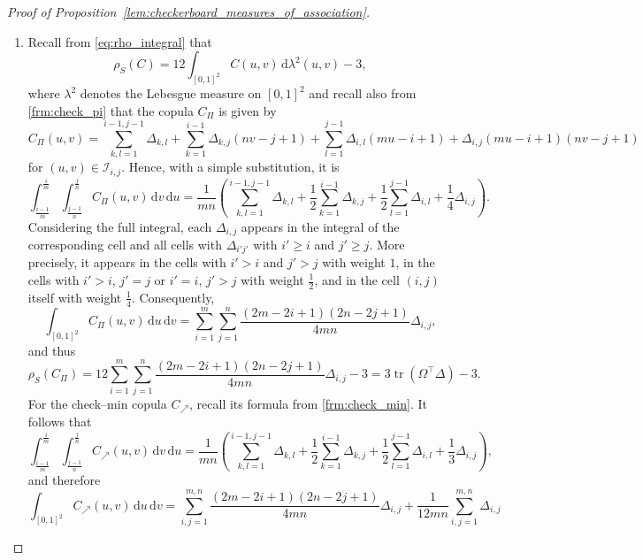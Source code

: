 \documentclass{article}
\theoremstyle{definition}
\newcommand{\II}{\mathcal{I}}  %
\DeclareMathOperator{\tr}{tr}  %
\newcommand{\de}{\mathrm{\,d}}
\begin{document}
\begin{proof}[Proof of Proposition~\ref{lem:checkerboard_measures_of_association}]
    \label{proof:checkerboard_measures_of_association}
    ~\begin{enumerate}[label=(\roman*)]
        \item Recall from \eqref{eq:rho_integral} that
        \[
        \rho_S(C) = 12 \int_{[0,1]^2} C(u,v)\de \lambda^2(u,v)-3,
        \]
        where $\lambda^2$ denotes the Lebesgue measure on $[0,1]^2$ and recall also from \eqref{frm:check_pi} that the copula $C_{\Pi}$ is given by
        \small
        \[
            C_{\Pi}(u,v)
            = \sum_{k,l=1}^{i-1,j-1} \Delta_{k,l} + \sum_{k=1}^{i-1}\Delta_{k,j} (nv-j+1) + \sum_{l=1}^{j-1}\Delta_{i,l}(mu-i+1) + \Delta_{i,j} (mu-i+1)(nv-j+1)
        \]
        \normalsize
        for $(u,v) \in \II_{i,j}$.
        Hence, with a simple substitution, it is
        \[
            \int_{\frac{i-1}{m}}^{\frac{i}{m}}\int_{\frac{j-1}{n}}^{\frac{j}{n}} C_{\Pi}(u,v) \de v\de u
            = \frac{1}{mn}\left(\sum_{k,l=1}^{i-1,j-1}\Delta_{k,l} + \frac1{2}\sum_{k=1}^{i-1}\Delta_{k,j} + \frac1{2}\sum_{l=1}^{j-1}\Delta_{i,l} + \frac1{4}\Delta_{i,j}\right)
        .\]
        Considering the full integral, each $\Delta_{i,j}$ appears in the integral of the corresponding cell and all cells with $\Delta_{i'j'}$ with $i'\ge i$ and $j'\ge j$.
        More precisely, it appears in the cells with $i'>i$ and $j'>j$ with weight $1$, in the cells with $i'>i$, $j'=j$ or $i'=i$, $j'>j$ with weight $\frac12$, and in the cell $(i,j)$ itself with weight $\frac14$.
        Consequently,
        \[
        \int_{[0,1]^2} C_{\Pi}(u,v)\de u\de v
        =\sum_{i=1}^{m}\sum_{j=1}^{n} \frac{(2m-2i+1)(2n-2j+1)}{4mn}\Delta_{i,j}
        ,\]
        and thus
        \[
        \rho_S(C_{\Pi})
        =12\sum_{i=1}^{m}\sum_{j=1}^{n}\frac{(2m-2i+1)(2n-2j+1)}{4mn}\Delta_{i,j}-3
        =3 \tr\left(\Omega^\top\Delta\right) - 3
        .\]
        For the check--min copula $C_{\nearrow}$, recall its formula from \eqref{frm:check_min}.
        It follows that
        \[
            \int_{\frac{i-1}{m}}^{\frac{i}{m}}\int_{\frac{j-1}{n}}^{\frac{j}{n}} C_{\nearrow}(u,v) \de v\de u
            = \frac{1}{mn}\left(\sum_{k,l=1}^{i-1,j-1}\Delta_{k,l} + \frac1{2}\sum_{k=1}^{i-1}\Delta_{k,j} + \frac1{2}\sum_{l=1}^{j-1}\Delta_{i,l} + \frac1{3}\Delta_{i,j}\right)
        ,\]
        and therefore
        \[
            \int_{[0,1]^2} C_{\nearrow}(u,v)\de u\de v
            =\sum_{i,j=1}^{m,n} \frac{(2m-2i+1)(2n-2j+1)}{4mn}\Delta_{i,j} + \frac1{12mn}\sum_{i,j=1}^{m,n} \Delta_{i,j}
\]
\end{enumerate}
\end{proof}
\end{document}
